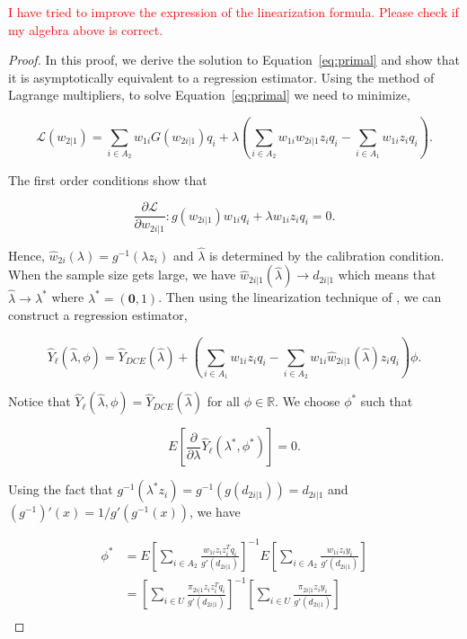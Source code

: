 \documentclass[12pt]{article}
\renewcommand{\bf}[1]{\mathbf{#1}}
\begin{document}
\textcolor{red}{I have tried to improve the expression of the linearization formula. Please check if my algebra above is correct. }
\begin{proof}
  In this proof, we derive the solution to Equation~\ref{eq:primal} and show
  that it is asymptotically equivalent to a regression estimator. Using the
  method of Lagrange multipliers, to solve Equation~\ref{eq:primal} we need to
  minimize,

  $$\mathcal{L}(w_{2|1}) = \sum_{i \in A_2} w_{1i} G(w_{2i|1}) q_i + 
  \lambda \left(\sum_{i \in A_2} w_{1i} w_{2i|1} z_i q_i - \sum_{i \in A_1} w_{1i}
  z_i q_i\right).$$

  The first order conditions show that

  $$\frac{\partial \mathcal{L}}{\partial w_{2i|1}}: g(w_{2i|1}) w_{1i}q_i +
    \lambda w_{1i} z_i q_i = 0.$$

  Hence, $\hat w_{2i}(\lambda) = g^{-1}(\lambda z_i)$ and $\hat \lambda$ is
  determined by the calibration condition. When the sample size gets large, we
  have $\hat w_{2i|1}(\hat \lambda) \to d_{2i|1}$ which means that $\hat \lambda
  \to \lambda^*$ where $\lambda^* = (\bf 0, 1)$. Then using the linearization
  technique of \cite{randles1982asymptotic}, we can construct a regression
  estimator, 

  $$\hat Y_\ell(\hat \lambda, \phi)  = \hat Y_{DCE}(\hat \lambda) + 
  \left(\sum_{i \in A_1} w_{1i} z_i q_i - \sum_{i \in A_2} w_{1i} \hat w_{2i|1}(\hat
  \lambda) z_i q_i\right)\phi.$$

  Notice that $\hat Y_\ell(\hat \lambda, \phi) = \hat Y_{DCE}(\hat \lambda)$ for
  all $\phi \in \mathbb{R}$. We choose $\phi^*$ such that

  $$E\left[\frac{\partial}{\partial \lambda} \hat Y_\ell(\lambda^*, \phi^*)\right]=0.$$

  Using the fact that $g^{-1}(\lambda^* z_i) = g^{-1}(g(d_{2i|1})) = d_{2i|1}$
  and $(g^{-1})'(x) = 1 / g'(g^{-1}(x))$, we have

  \begin{align*}
    \phi^*
    &= E\left[\sum_{i \in A_2} \frac{w_{1i}z_i z_i^T q_i}{g'(d_{2i|1})}\right]^{-1}
    E\left[\sum_{i \in A_2} \frac{w_{1i}z_i y_i}{g'(d_{2i|1})}\right]\\
    &= \left[\sum_{i \in U} \frac{\pi_{2i|1}z_i z_i^T q_i}{g'(d_{2i|1})}\right]^{-1}
    \left[\sum_{i \in U} \frac{\pi_{2i|1} z_i y_i}{g'(d_{2i|1})}\right]\\
  \end{align*}


\end{proof}
\end{document}
